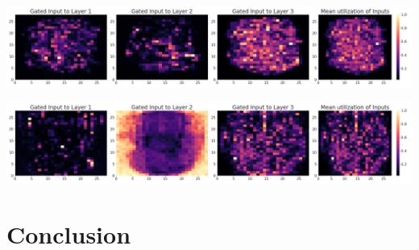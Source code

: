 \documentclass{article}
\begin{document}
\centering
\includegraphics[scale=0.2]{paper/mnist_vis.png}
\label{fig:mnist_vis}

\centering
\includegraphics[scale=0.2]{paper/fashionmnist_vis.png}
\label{fig:fashion_mnist_vis}


\section{Conclusion}



  







\end{document}

